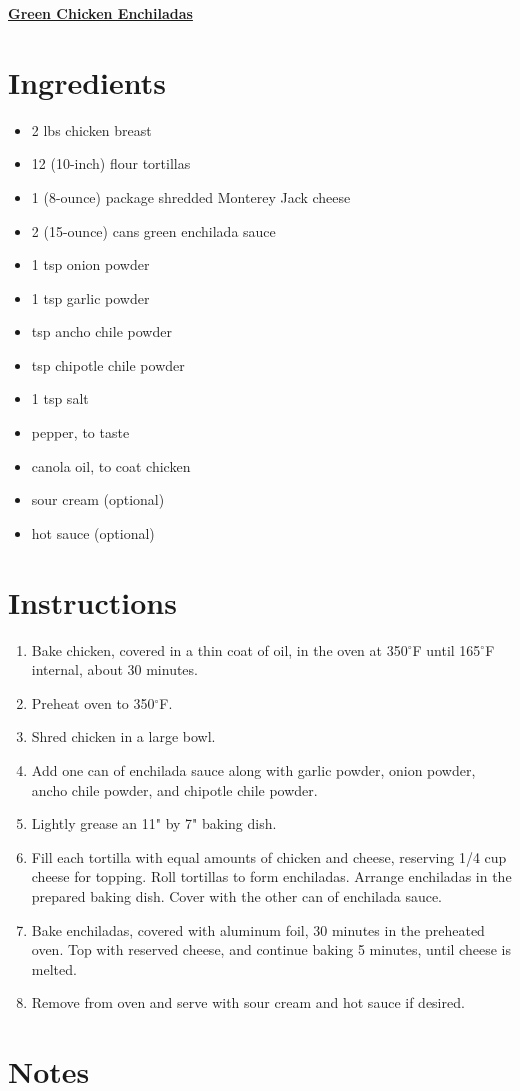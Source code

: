 \documentclass[11pt]{article}
\begin{document}
	\begin{center}\begin{huge}\underline{\textbf{Green Chicken Enchiladas}}\end{huge}\end{center}

	\section*{Ingredients}
	\begin{itemize}
		\item 2 lbs chicken breast
		\item 12 (10-inch) flour tortillas
		\item 1 (8-ounce) package shredded Monterey Jack cheese
		\item 2 (15-ounce) cans green enchilada sauce
		\item 1 tsp onion powder
		\item 1 tsp garlic powder
		\item {} tsp ancho chile powder
		\item {} tsp chipotle chile powder
		\item 1 tsp salt
		\item pepper, to taste
		\item canola oil, to coat chicken
		\item sour cream (optional)
		\item hot sauce (optional)
	\end{itemize}
	
	\section*{Instructions}
	\begin{enumerate}
		\item Bake chicken, covered in a thin coat of oil, in the oven at 350$^\circ$F until 165$^\circ$F internal, about 30 minutes.
		\item Preheat oven to 350$^\circ$F.
		\item Shred chicken in a large bowl.
		\item Add one can of enchilada sauce along with garlic powder, onion powder, ancho chile powder, and chipotle chile powder.
		\item Lightly grease an 11" by 7" baking dish.
		\item Fill each tortilla with equal amounts of chicken and cheese, reserving 1/4 cup cheese for topping. Roll tortillas to form enchiladas. Arrange enchiladas in the prepared baking dish. Cover with the other can of enchilada sauce.
		\item Bake enchiladas, covered with aluminum foil, 30 minutes in the preheated oven. Top with reserved cheese, and continue baking 5 minutes, until cheese is melted.
		\item Remove from oven and serve with sour cream and hot sauce if desired.
	\end{enumerate}
	
	\section*{Notes}
	
\end{document}

